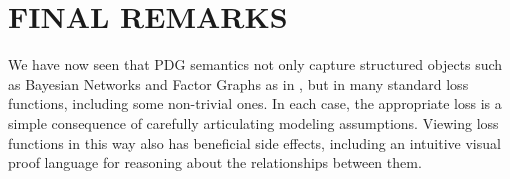 \documentclass[twoside]{article}
\makeatletter
\newif\ifmarginprooflinks
\theoremstyle{plain}
\theoremstyle{definition}
\DeclareMathOperator*{\Ex}{\mathbb{E}} %
\newcommand{\datadist}[1]{\Pr\nolimits_{#1}}
\newcommand{\V}{\mathcal V}
\newcommand\aar{\@ifstar\aar@one@star\aar@plain}
\newcommand\aar@one@star{\@ifstar\aar@resize{\aar@plain*}}
\newcommand\aar@resize[1]{\sbox{\aar@content}{#1}\scaleleftright[3.8ex]
			{\Biggl\langle\!\!\!\!\Biggl\langle}{\usebox{\aar@content}}
			{\Biggr\rangle\!\!\!\!\Biggr\rangle}}
\newenvironment{linked}[3][]{%
			\def\linkedproof{#3}%
			\def\linkedtype{#2}%
			\ifmarginprooflinks
			\marginpar{%
				\vspace{1.5em}
				\centering%
				\hyperref[proof:\linkedproof]{%
				\color{blue!30!white}%
				\scaleleftright{$\Big[$}{\,\mbox{\footnotesize\centering\tt\begin{tabular}{@{}c@{}}
					link to\\[-0.15em]
					proof
				\end{tabular}}\,}{$\Big]$}}~
				}%
			\fi
	        \restatable[#1]{#2}{#2:#3}\label{#2:#3}%
	        }%
			{\endrestatable%
			}
\makeatother
\begin{document}
%
%
%
%
%
%
%
%


\section{FINAL REMARKS}


We have now seen that PDG semantics not only capture structured objects such as Bayesian Networks and Factor Graphs as in \textcite{richardson2020probabilistic},
but in 
%
many standard loss functions, including some non-trivial ones.
In each case, the appropriate loss is a simple consequence of carefully articulating modeling assumptions.
Viewing loss functions in this way also has beneficial side effects, including an intuitive visual proof language for reasoning about the relationships between them.
\end{document}
